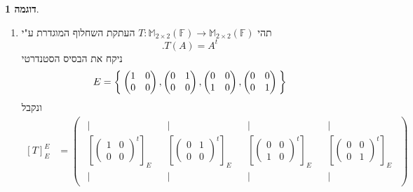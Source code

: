 \documentclass[12pt]{report}
\theoremstyle{plain}
\theoremstyle{definition}
\newtheorem{example}{דוגמה}[chapter]
\newcommand{\F}{\mathbb{F}}
\newcommand{\M}{\mathbb{M}}
\newcommand{\0}{\mathbf{0}}
\begin{document}
\begin{example}
\begin{enumerate}[label=\alph*.]
\item 
תהי
$T:\M_{2\times 2}(\F)\to\M_{2\times 2}(\F)$
העתקת השחלוף המוגדרת ע"י
$$
.T(A)=A^t
$$
ניקח את הבסיס הסטנדרטי
$$
E=\Set{\begin{pmatrix}
1 & 0 \\
0 & 0
\end{pmatrix},\begin{pmatrix}
0 & 1 \\
0 & 0
\end{pmatrix},\begin{pmatrix}
0 & 0 \\
1 & 0
\end{pmatrix},\begin{pmatrix}
0 & 0 \\
0 & 1
\end{pmatrix}}
$$
ונקבל
$$
\begin{aligned}
[T]_E^E&=\begin{pmatrix}
\begin{array}{c}
|\\[-0.4ex]
\left[\begin{pmatrix}
1 & 0 \\
0 & 0
\end{pmatrix}^t\right]_E\\[-0.4ex]
|
\end{array}
&
\begin{array}{c}
|\\[-0.4ex]
\left[\begin{pmatrix}
0 & 1 \\
0 & 0
\end{pmatrix}^t\right]_E\\[-0.4ex]
|
\end{array}
&
\begin{array}{c}
|\\[-0.4ex]
\left[\begin{pmatrix}
0 & 0 \\
1 & 0
\end{pmatrix}^t\right]_E\\[-0.4ex]
|
\end{array}
&
\begin{array}{c}
|\\[-0.4ex]
\left[\begin{pmatrix}
0 & 0 \\
0 & 1
\end{pmatrix}^t\right]_E\\[-0.4ex]
|
\end{array}
\end{pmatrix} \\

\end{aligned}$$
\end{enumerate}
\end{example}
\end{document}

